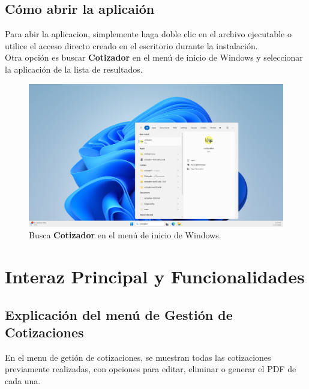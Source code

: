 \documentclass{Pretexto/bluereport}
\begin{document}
\subsection{Cómo abrir la aplicaión}
\vspace{0.1cm}
\begin{minipage}

Para abir la aplicacion, simplemente haga doble clic en el archivo ejecutable o utilice el acceso directo creado en el escritorio durante la instalación.
\\Otra opción es buscar \textbf{Cotizador} en el menú de inicio de Windows y seleccionar la aplicación de la lista de resultados.
    \begin{figure}[H]
        \centering
            \includegraphics[width=0.85\linewidth]{img/barra-navegacion.png}
        \caption{Busca \textbf{Cotizador} en el menú de inicio de Windows.}
        \label{fig:abrir_desde_inicio}
    \end{figure}
\pagebreak
\section{Interaz Principal y Funcionalidades}
\subsection{Explicación del menú de Gestión de Cotizaciones}

En el menu de getión de cotizaciones, se muestran todas las cotizaciones previamente realizadas, con opciones para editar,
 eliminar o generar el PDF de cada una.


\end{minipage}
\end{document}
